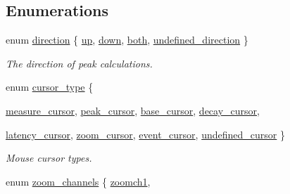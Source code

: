 \subsection*{Enumerations}
\begin{DoxyCompactItemize}
\item 
enum \hyperlink{group__stfgen_gae8845ae2aeaf4b742a905a2a5571fd5a}{direction} \{ \hyperlink{group__stfgen_ggae8845ae2aeaf4b742a905a2a5571fd5aaf12a3d86708046ee92fa400c99fcbecb}{up}, 
\hyperlink{group__stfgen_ggae8845ae2aeaf4b742a905a2a5571fd5aaccaa84903131c15d67e4f95298e68e2b}{down}, 
\hyperlink{group__stfgen_ggae8845ae2aeaf4b742a905a2a5571fd5aa22cccef6520f7679886dc6d584805ce3}{both}, 
\hyperlink{group__stfgen_ggae8845ae2aeaf4b742a905a2a5571fd5aab5df1157da4f45612d5815bc164e0931}{undefined\_\-direction}
 \}
\begin{DoxyCompactList}\small\item\em The direction of peak calculations. \item\end{DoxyCompactList}\item 
enum \hyperlink{group__stfgen_gad2d1acb3ac0c16ee32b5f4d3a1ab4abf}{cursor\_\-type} \{ \par
\hyperlink{group__stfgen_ggad2d1acb3ac0c16ee32b5f4d3a1ab4abfa1b879af00b1b8b8c4a195c0b27de3f0b}{measure\_\-cursor}, 
\hyperlink{group__stfgen_ggad2d1acb3ac0c16ee32b5f4d3a1ab4abfad99eafbc283ce642e9ff607357c95e9b}{peak\_\-cursor}, 
\hyperlink{group__stfgen_ggad2d1acb3ac0c16ee32b5f4d3a1ab4abfa8c54633348bfe4fdeaf6c8ddf06fccba}{base\_\-cursor}, 
\hyperlink{group__stfgen_ggad2d1acb3ac0c16ee32b5f4d3a1ab4abfab09f70483c5bed40addf3c21eb528afe}{decay\_\-cursor}, 
\par
\hyperlink{group__stfgen_ggad2d1acb3ac0c16ee32b5f4d3a1ab4abfabb059a629fb7fbf5d9a3f83c44954b9b}{latency\_\-cursor}, 
\hyperlink{group__stfgen_ggad2d1acb3ac0c16ee32b5f4d3a1ab4abfadb6eff6e3108c48f2dd357dc3b539238}{zoom\_\-cursor}, 
\hyperlink{group__stfgen_ggad2d1acb3ac0c16ee32b5f4d3a1ab4abfa28885ead48beb5a6da1810d391d41760}{event\_\-cursor}, 
\hyperlink{group__stfgen_ggad2d1acb3ac0c16ee32b5f4d3a1ab4abfa2794c8863a730fbd8e4dea7f93b8dfa7}{undefined\_\-cursor}
 \}
\begin{DoxyCompactList}\small\item\em Mouse cursor types. \item\end{DoxyCompactList}\item 
enum \hyperlink{group__stfgen_ga9a792b11c01e9429bfe2acd3e4ef108b}{zoom\_\-channels} \{ \hyperlink{group__stfgen_gga9a792b11c01e9429bfe2acd3e4ef108bafdaacd56a89cce6998f8fcc331b0f665}{zoomch1}, 

\end{DoxyCompactItemize}

